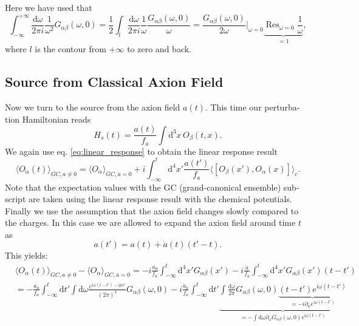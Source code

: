 \documentclass[master,       %
               twoside,        %
               BCOR10mm,       %
               english,ngerman, %
               ]{GAUBM}
\begin{document}
\begin{otherlanguage}{english}
\begin{equation}
	\label{eq:chemical_potentials_linear_response}
\end{equation}
Here we have used that
\begin{equation}
	\int_{-\infty}^{+\infty} \frac{\mathrm{d} \omega}{2\pi i} \frac{1}{\omega^2} G_{\alpha \beta}(\omega, 0) = \frac{1}{2} \int_l \frac{\mathrm{d} \omega}{2\pi i} \frac{1}{\omega} \frac{G_{\alpha \beta}(\omega, 0)}{\omega} = \frac{G_{\alpha \beta}(\omega, 0)}{2 \omega} \Big|_{\omega = 0} \underbrace{\operatorname{Res}_{\omega = 0} \frac{1}{\omega}}_{= 1},
\end{equation}
where $l$ is the contour from $+\infty$ to zero and back.

\subsection{Source from Classical Axion Field}
Now we turn to the source from the axion field $a(t)$.
This time our perturbation Hamiltonian reads
\begin{equation}
	H_s(t) = \frac{a(t)}{f_a} \int \mathrm{d}^3 x \, O_\beta(t, x).
\end{equation}
We again use eq. \eqref{eq:linear_response} to obtain the linear response result
\begin{equation}
	\langle O_\alpha(t) \rangle_{GC, a \ne 0} = \langle O_\alpha \rangle_{GC, a = 0} + i \int_{-\infty}^t \mathrm{d}^4 x' \frac{a(t')}{f_a} \langle [ O_\beta(x'), O_\alpha(x)] \rangle_c.
\end{equation}
Note that the expectation values with the GC (grand-canonical ensemble) subscript are taken using the linear response result with the chemical potentials.
Finally we use the assumption that the axion field changes slowly compared to the charges. In this case we are allowed to expand the axion field
around time $t$ as
\begin{equation}
	a(t') = a(t) + \dot{a}(t)(t' - t).
\end{equation}
This yields:
\begin{align}
	 &\langle O_\alpha(t) \rangle_{GC, a \ne 0} - \langle O_\alpha  \rangle_{GC, a = 0} = - i \frac{a_0}{f_a} \int_{-\infty}^t \mathrm{d}^4 x' G_{\alpha \beta}(x') - i \frac{\dot{a}}{f_a} \int_{-\infty}^t \mathrm{d}^4 x' G_{\alpha \beta}(x') (t - t')
	 \nonumber \\
	 &= - \frac{a_0}{f_a} \int_{-\infty}^t \mathrm{d} t' \int \mathrm{d} \omega \frac{e^{i \omega (t - t') - i p x'}}{(2\pi)^4} G_{\alpha \beta}(\omega, 0)
	 -i \frac{\dot{a}_0}{f_a} \int_{-\infty}^t \mathrm{d} t' \underbrace{\int \frac{\mathrm{d} \omega}{2 \pi} G_{\alpha \beta}(\omega, 0) \underbrace{(t - t') e^{i \omega (t - t')}}_{= -i \partial_\omega e^{i \omega (t - t')}}}_{= - \int \mathrm{d} \omega \partial_\omega G_{\alpha \beta}(\omega, 0) e^{i \omega (t - t')}}

\end{align}
\end{otherlanguage}
\end{document}

